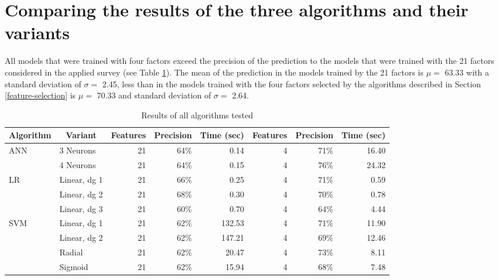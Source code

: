 \documentclass[]{book}
\begin{document}
\section{Comparing the results of the three algorithms and their
variants}\label{comparing-the-results-of-the-three-algorithms-and-their-variants}

All models that were trained with four factors exceed the precision of
the prediction to the models that were trained with the 21 factors
considered in the applied survey (see Table
\ref{tab:results-of-all-algoritms}). The mean of the prediction in the
models trained by the 21 factors is \(\mu=\) 63.33 with a standard
deviation of \(\sigma=\) 2.45, less than in the models trained with the
four factors selected by the algorithms described in Section
\ref{feature-selection} is \(\mu=\) 70.33 and standard deviation of
\(\sigma =\) 2.64.

\begin{table}[ht]
    \centering
    \caption{Results of all algorithms tested}
    \label{tab:results-of-all-algoritms}
    \begin{tabular}{llrrrrrr}
        \hline
        \multicolumn{1}{c}{\textbf{Algorithm}}  & \multicolumn{1}{c}{\textbf{Variant}} & \multicolumn{1}{p{1.5cm}}{\textbf{Features}} & \multicolumn{1}{c}{\textbf{Precision}} & \multicolumn{1}{p{1cm}}{\textbf{Time (sec)}} & \multicolumn{1}{p{1.5cm}}{\textbf{Features}} & \textbf{Precision} & \multicolumn{1}{p{1cm}}{\textbf{Time (sec)}} \\ \hline
        \multirow{2}{*}{ANN} & 3 Neurons    & 21  & 64\%  & 0.14   & 4  & 71\%   & 16.40   \\
                             & 4 Neurons    & 21  & 64\%  & 0.15   & 4  & 76\%   & 24.32    \\ \hline
        \multirow{3}{*}{LR}  & Linear, dg 1 & 21  & 66\%  & 0.25   & 4  & 71\%   & 0.59      \\
                             & Linear, dg 2 & 21  & 68\%  & 0.30   & 4  & 70\%   & 0.78       \\
                             & Linear, dg 3 & 21  & 60\%  & 0.70   & 4  & 64\%   & 4.44       \\ \hline
        \multirow{4}{*}{SVM} & Linear, dg 1 & 21  & 62\%  & 132.53 & 4  & 71\%   & 11.90      \\
                             & Linear, dg 2 & 21  & 62\%  & 147.21 & 4  & 69\%   & 12.46   \\
                             & Radial       & 21  & 62\%  & 20.47  & 4  & 73\%   & 8.11    \\
                             & Sigmoid      & 21  & 62\%  & 15.94  & 4  & 68\%   & 7.48   \\ \hline
    \end{tabular}
\end{table}
\end{document}
